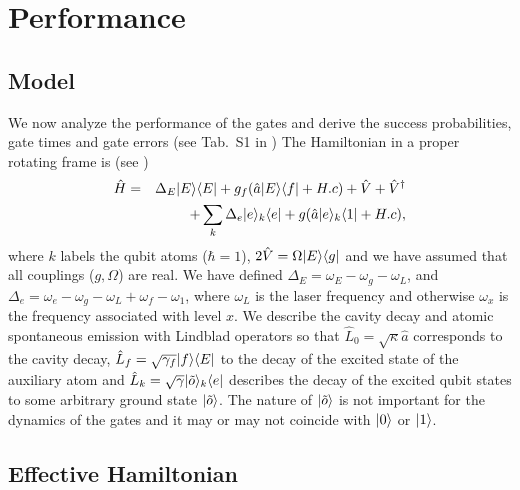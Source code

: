 \section{Performance}

\subsection{Model}
We now analyze the performance of the gates and derive the success
probabilities, gate times and gate errors (see Tab.~S1 in \cite{SM}) The
Hamiltonian in a proper rotating frame is (see )
\begin{eqnarray}
\hat{H}&=&
\Delta_{E}| E \rangle
\langle E |+g_{f}(\hat{a}| E \rangle\langle f |+H.c)+\hat{V}+\hat{V}^{\dagger} \nonumber \\
&&+\sum_{k}\Delta_{e}| e \rangle_{k}\langle e |+g(\hat{a}| e \rangle_{k}\langle 1 |+H.c),
\end{eqnarray}          
where $k$ labels the qubit atoms ($\hbar=1$), $2\hat{V}=\Omega| E \rangle\langle g |$
and we have assumed that all couplings ($g,\Omega$) are real. We have defined
$\Delta_{E}=\omega_{E}-\omega_{g}-\omega_{L}$, and
$\Delta_{e}=\omega_{e}-\omega_{g}-\omega_{L}+\omega_{f}-\omega_{1}$, where
$\omega_{L}$ is the laser frequency and otherwise $\omega_{x}$ is the frequency
associated with level $x$. We describe the cavity decay and atomic spontaneous
emission with Lindblad operators so that $\hat{L}_{0}=\sqrt{\kappa}\hat{a}$
corresponds to the cavity decay,  $\hat{L}_{f}=\sqrt{\gamma_{f}}| f \rangle\langle E |$
to the decay of the excited state of the auxiliary atom and
$\hat{L}_{k}=\sqrt{\gamma}| \tilde{o} \rangle_{k}\langle e |$ describes the decay of the
excited qubit states to some arbitrary ground state $| \tilde{o} \rangle$. The
nature of $| \tilde{o} \rangle$ is not important for the dynamics of the gates and
it may or may not coincide with $| 0 \rangle$ or $| 1 \rangle$.

\subsection{Effective Hamiltonian}

